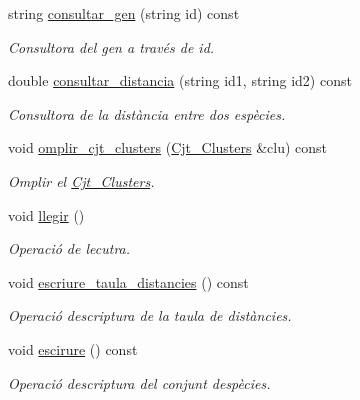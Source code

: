 \begin{DoxyCompactItemize}
string \hyperlink{class_cjt___especies_a5f4595e63cfede3377383b4fb1c35681}{consultar\+\_\+gen} (string id) const
\begin{DoxyCompactList}\small\item\em Consultora del gen a través de id. \end{DoxyCompactList}\item 
double \hyperlink{class_cjt___especies_a1d8c033fe5697951d2b24c4f732b28e5}{consultar\+\_\+distancia} (string id1, string id2) const
\begin{DoxyCompactList}\small\item\em Consultora de la distància entre dos espècies. \end{DoxyCompactList}\item 
void \hyperlink{class_cjt___especies_a311090cf3df21cf719ab4419a662d9aa}{omplir\+\_\+cjt\+\_\+clusters} (\hyperlink{class_cjt___clusters}{Cjt\+\_\+\+Clusters} \&clu) const
\begin{DoxyCompactList}\small\item\em Omplir el \hyperlink{class_cjt___clusters}{Cjt\+\_\+\+Clusters}. \end{DoxyCompactList}\item 
void \hyperlink{class_cjt___especies_a2a0658d5acd67177881acc6f621fe2c0}{llegir} ()
\begin{DoxyCompactList}\small\item\em Operació de lecutra. \end{DoxyCompactList}\item 
void \hyperlink{class_cjt___especies_a67e8351cb59ce549033245fe4c829248}{escriure\+\_\+taula\+\_\+distancies} () const
\begin{DoxyCompactList}\small\item\em Operació d\textquotesingle{}escriptura de la taula de distàncies. \end{DoxyCompactList}\item 
void \hyperlink{class_cjt___especies_a6efd9dcaa89cd13823df8e6edde71603}{escirure} () const
\begin{DoxyCompactList}\small\item\em Operació d\textquotesingle{}escriptura del conjunt d\textquotesingle{}espècies. \end{DoxyCompactList}\end{DoxyCompactItemize}
